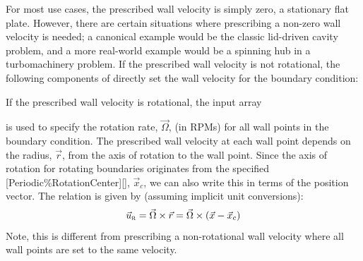 For most use cases, the prescribed wall velocity is simply zero, \forexample a
stationary flat plate.
%
However, there are certain situations where prescribing a non-zero wall velocity
is needed; a canonical example would be the classic lid-driven cavity problem,
and a more real-world example would be a spinning hub in a turbomachinery
problem.
%
If the prescribed wall velocity is not rotational, the following components of
\BCinptext{} directly set the wall velocity for the boundary condition:
%
\begin{InputExample}
  \item[{\BCinpBC[nmlBC::BCInput/VelocityX]{VelocityX}}]
  \item[{\BCinpBC[nmlBC::BCInput/VelocityY]{VelocityY}}]
  \item[{\BCinpBC[nmlBC::BCInput/VelocityZ]{VelocityZ}}]
\end{InputExample}
%
If the prescribed wall velocity is rotational, the input array
%
\begin{InputExample}
\item[{\BCinpBC[nmlBC::BCInput/RotationRate]{Rotation\_Rate(1:3)}[Rotation\_Rate]}]
\end{InputExample}
%
is used to specify the rotation rate, $\vec{\Omega}$, (in RPMs) for all wall
points in the boundary condition.
%
%
The prescribed wall velocity at each wall point depends on the radius,
$\vec{r}$, from the axis of rotation to the wall point.
%
Since the axis of rotation for rotating boundaries originates from the
specified 
      [Periodic\%RotationCenter][],
$\vec{x}_c$, we can also write this in terms of the position vector.
%
The relation is given by (assuming implicit unit conversions):
%
\begin{equation*}
  \vec{u}_{\textsc{r}} = \vec{\Omega} \times \vec{r}
                = \vec{\Omega} \times \left( \vec{x} - \vec{x}_c \right)
\end{equation*}
%
Note, this is different from prescribing a non-rotational wall velocity where
all wall points are set to the same velocity.


